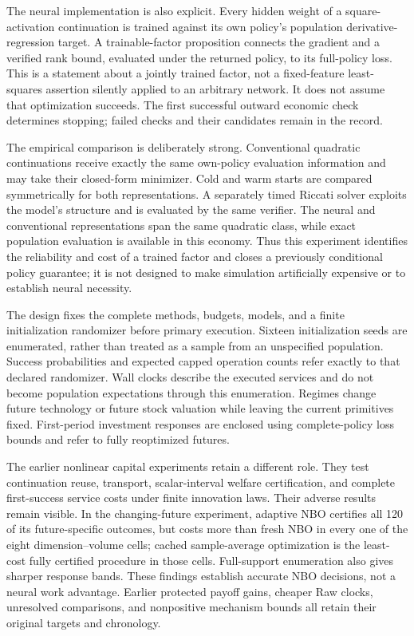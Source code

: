 The neural implementation is also explicit. Every hidden weight of a
square-activation continuation is trained against its own policy's
population derivative-regression target. A trainable-factor proposition
connects the gradient and a verified rank bound, evaluated under the
returned policy, to its full-policy loss. This is a statement about a
jointly trained factor, not a fixed-feature least-squares assertion silently
applied to an arbitrary network. It does not assume that optimization
succeeds. The first successful outward economic check determines stopping;
failed checks and their candidates remain in the record.

The empirical comparison is deliberately strong. Conventional quadratic
continuations receive exactly the same own-policy evaluation information
and may take their closed-form minimizer. Cold and warm starts are compared
symmetrically for both representations. A separately timed Riccati solver
exploits the model's structure and is evaluated by the same verifier. The
neural and conventional representations span the same quadratic class,
while exact population evaluation is available in this economy. Thus this
experiment identifies the reliability and cost of a trained factor and
closes a previously conditional policy guarantee; it is not designed to
make simulation artificially expensive or to establish neural necessity.

The design fixes the complete methods, budgets, models, and a finite
initialization randomizer before primary execution. Sixteen initialization
seeds are enumerated, rather than treated as a sample from an unspecified
population. Success probabilities and expected capped operation counts
refer exactly to that declared randomizer. Wall clocks describe the
executed services and do not become population expectations through this
enumeration. Regimes change future technology or future stock valuation
while leaving the current primitives fixed. First-period investment
responses are enclosed using complete-policy loss bounds and refer to
fully reoptimized futures.

The earlier nonlinear capital experiments retain a different role. They
test continuation reuse, transport, scalar-interval welfare certification,
and complete first-success service costs under finite innovation laws.
Their adverse results remain visible. In the changing-future experiment,
adaptive NBO certifies all 120 of its future-specific outcomes, but costs
more than fresh NBO in every one of the eight dimension--volume cells;
cached sample-average optimization is the least-cost fully certified
procedure in those cells. Full-support enumeration also gives sharper
response bands. These findings establish accurate NBO decisions, not a
neural work advantage. Earlier protected payoff gains, cheaper Raw clocks,
unresolved comparisons, and nonpositive mechanism bounds all retain their
original targets and chronology.

